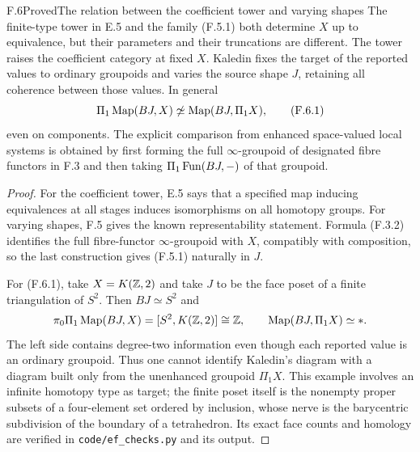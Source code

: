 \begin{claim}{F.6}{Proved}{The relation between the coefficient tower and varying shapes}
The finite-type tower in E.5 and the family (F.5.1) both determine
$X$ up to equivalence, but their parameters and their truncations
are different.  The tower raises the coefficient category at fixed
$X$.  Kaledin fixes the target of the reported values to ordinary
groupoids and varies the source shape $J$, retaining all coherence
between those values.  In general
\[
 \Pi_1\operatorname{Map}(BJ,X)\not\simeq
             \operatorname{Map}(BJ,\Pi_1X),                                \tag{F.6.1}
\]
even on components.  The explicit comparison from enhanced
space-valued local systems is obtained by first forming the full
$\infty$-groupoid of designated fibre functors in F.3 and then
taking $\Pi_1\operatorname{Fun}(BJ,-)$ of that groupoid.
\end{claim}
\begin{proof}
For the coefficient tower, E.5 says that a specified map inducing
equivalences at all stages induces isomorphisms on all homotopy
groups.  For varying shapes, F.5 gives the known representability
statement.  Formula (F.3.2) identifies the full fibre-functor
$\infty$-groupoid with $X$, compatibly with composition, so the
last construction gives (F.5.1) naturally in $J$.

For (F.6.1), take $X=K(\mathbb Z,2)$ and take $J$ to be the face poset
of a finite triangulation of $S^2$.  Then $BJ\simeq S^2$ and
\[
 \pi_0\Pi_1\operatorname{Map}(BJ,X)
       =[S^2,K(\mathbb Z,2)]\cong\mathbb Z,
 \qquad \operatorname{Map}(BJ,\Pi_1X)\simeq *.
\]
The left side contains degree-two information even though each
reported value is an ordinary groupoid.  Thus one cannot identify
Kaledin's diagram with a diagram built only from the unenhanced
groupoid $\Pi_1X$.  This example involves an infinite homotopy
type as target; the finite poset itself is the nonempty proper
subsets of a four-element set ordered by inclusion, whose nerve
is the barycentric subdivision of the boundary of a tetrahedron.
Its exact face counts and homology are verified in
\texttt{code/ef\_checks.py} and its output.
\end{proof}

